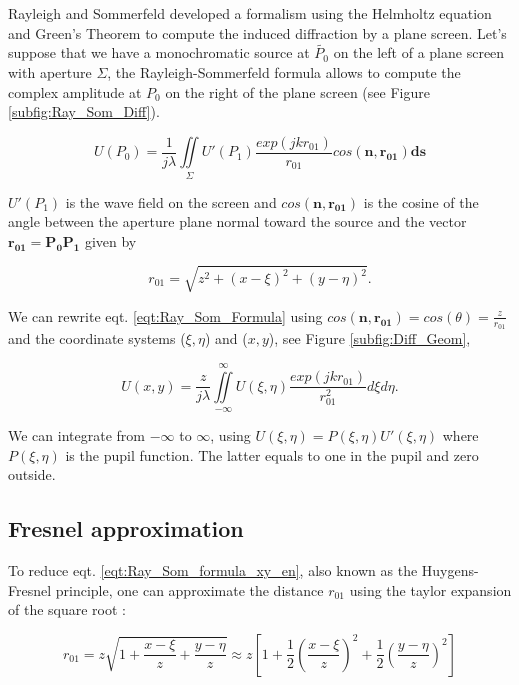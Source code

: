 Rayleigh and Sommerfeld developed a formalism using the Helmholtz equation and Green's Theorem to compute the induced diffraction by a plane screen. Let's suppose that we have a monochromatic source at $\widetilde{P_0}$ on the left of a plane screen with aperture $\Sigma$, the Rayleigh-Sommerfeld formula allows to compute the complex amplitude at $P_0$ on the right of the plane screen (see Figure \ref{subfig:Ray_Som_Diff}).

\begin{equation}
U(P_0) = \frac{1}{j\lambda} \iint\limits_{\Sigma} U'(P_1)\frac{exp(jkr_{01})}{r_{01}}cos(\mathbf{n},\mathbf{r_{01}})\mathbf{ds}
\label{eqt:Ray_Som_Formula}
\end{equation}

$U'(P_1)$ is the wave field on the screen and $cos(\mathbf{n},\mathbf{r_{01}})$ is the cosine of the angle between the aperture plane normal toward the source and the vector $\mathbf{r_{01}} = \mathbf{P_0P_1}$ given by 

\begin{equation}
r_{01} = \sqrt{z^2 + (x-\xi)^2 + (y-\eta)^2}.
\label{eqt:r_01}
\end{equation}

We can rewrite eqt. \eqref{eqt:Ray_Som_Formula} using $cos(\mathbf{n},\mathbf{r_{01}}) = cos(\theta) = \frac{z}{r_{01}}$ and the coordinate systems ($\xi,\eta$) and ($x,y$), see Figure \ref{subfig:Diff_Geom},

\begin{equation}
U(x,y) = \frac{z}{j\lambda} \iint\limits_{-\infty}^{\infty} U(\xi,\eta)\frac{exp(jkr_{01})}{r_{01}^2} d\xi d\eta.
\label{eqt:Ray_Som_formula_xy_en}
\end{equation}

We can integrate from $-\infty$ to $\infty$, using $U(\xi,\eta) = P(\xi,\eta)U'(\xi,\eta)$ where $P(\xi,\eta)$ is the pupil function. The latter equals to one in the pupil and zero outside. 

\subsection{Fresnel approximation}
\label{subsec:FresnelApprox}

To reduce eqt. \eqref{eqt:Ray_Som_formula_xy_en}, also known as the Huygens-Fresnel principle, one can approximate the distance $r_{01}$ using the taylor expansion of the square root :

\begin{equation}
r_{01} = z \sqrt{1 + \frac{x-\xi}{z} + \frac{y-\eta}{z}} \approx z \left[1+\frac{1}{2}\left(\frac{x-\xi}{z}\right)^2+\frac{1}{2}\left(\frac{y-\eta}{z}\right)^2\right]
\label{eqt:approx_r01}
\end{equation}

